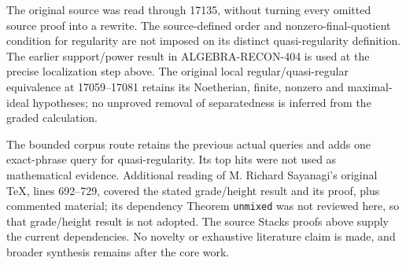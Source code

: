 The original source was read through 17135, without turning every omitted source proof into a rewrite. The source-defined order and nonzero-final-quotient condition for regularity are not imposed on its distinct quasi-regularity definition. The earlier support/power result in ALGEBRA-\AlgebraIdentifierBreak{}RECON-\AlgebraIdentifierBreak{}404 is used at the precise localization step above. The original local regular/quasi-regular equivalence at 17059--17081 retains its Noetherian, finite, nonzero and maximal-ideal hypotheses; no unproved removal of separatedness is inferred from the graded calculation.

The bounded corpus route retains the previous actual queries and adds one exact-phrase query for quasi-regularity. Its top hits were not used as mathematical evidence. Additional reading of M. Richard Sayanagi's original TeX, lines 692--729, covered the stated grade/height result and its proof, plus commented material; its dependency Theorem \texttt{unmixed} was not reviewed here, so that grade/height result is not adopted. The source Stacks proofs above supply the current dependencies. No novelty or exhaustive literature claim is made, and broader synthesis remains after the core work.
